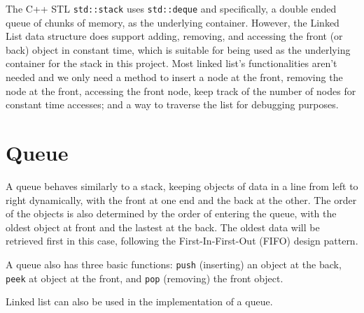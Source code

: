 \documentclass{article}
\begin{document}
The C++ STL \lstinline{std::stack} uses \lstinline{std::deque} and specifically, a double ended queue of chunks of memory, as the underlying container. However, the Linked List data structure does support adding, removing, and accessing the front (or back) object in constant time, which is suitable for being used as the underlying container for the stack in this project. Most linked list's functionalities aren't needed and we only need a method to insert a node at the front, removing the node at the front, accessing the front node, keep track of the number of nodes for constant time accesses; and a way to traverse the list for debugging purposes.

\section{Queue}
\label{queue}

A queue behaves similarly to a stack, keeping objects of data in a line from left to right dynamically, with the front at one end and the back at the other. The order of the objects is also determined by the order of entering the queue, with the oldest object at front and the lastest at the back. The oldest data will be retrieved first in this case, following the First-In-First-Out (FIFO) design pattern.

A queue also has three basic functions: \lstinline{push} (inserting) an object at the back, \lstinline{peek} at object at the front, and \lstinline{pop} (removing) the front object.

Linked list can also be used in the implementation of a queue.
\end{document}
